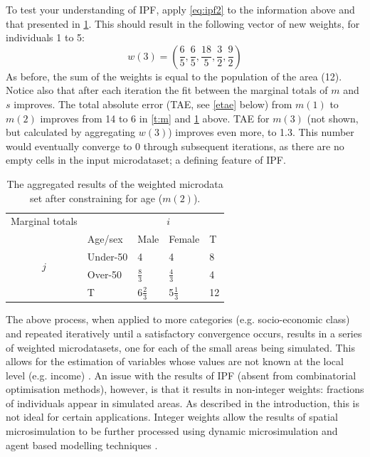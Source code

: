 \documentclass[a4paper, 11pt, twoside]{Thesis}
\begin{document}
To test your understanding of IPF, apply \cref{eq:ipf2} to the information above
and that presented in \cref{t:m2}.
This should result in the following vector of new weights, for individuals 1 to 5:
\begin{equation}
  w(3) = (\frac{6}{5}, \frac{6}{5}, \frac{18}{5}, \frac{3}{2}, \frac{9}{2})
\end{equation}
As before, the sum of the weights is equal to the population of the area (12).
Notice also that after each iteration the fit between the marginal
totals of $m$ and $s$
improves. The total absolute error (TAE, see \cref{etae} below)
from $m(1)$ to $m(2)$ improves from
14 to 6 in \cref{t:m} and \cref{t:m2} above. TAE for $m(3)$ (not shown,
but calculated by aggregating $w(3)$) improves even more, to 1.3.
This number would eventually converge to 0 through subsequent
iterations, as there are no empty cells in the input microdataset;
a defining feature of IPF.


\begin{table}[htbp]
\centering
\caption[Aggregated results after constraining for age]{The
aggregated results of the weighted
microdata set after constraining for age ($m(2)$).
}

\begin{tabular}{cllll}\toprule
Marginal totals&  & \multicolumn{2}{c}{$i$} & \\
& Age/sex & Male & Female & T\\ \midrule
\multirow{2}{*}{$j$} & Under-50 & 4 & 4 & 8\\
& Over-50 & $\frac{8}{3}$ & $\frac{4}{3}$ & 4 \\
& T & $6\frac{2}{3}$ & 5$\frac{1}{3}$ & 12\\
\bottomrule
\end{tabular}
\label{t:m2}
\end{table}

The above process, when applied to more categories (e.g. socio-economic class)
and repeated iteratively until a satisfactory convergence occurs, results in a
series of weighted microdatasets, one for each of the small areas being
simulated. This allows for the estimation of variables whose values are not
known at the local level (e.g. income) \citep{Ballas2005}. An issue
with the results of IPF (absent from combinatorial optimisation methods),
however, is that it results in non-integer weights: fractions of individuals
appear in simulated areas. As described in the introduction, this is not ideal
for certain applications. Integer weights allow the results of spatial
microsimulation to be further processed using dynamic microsimulation and agent
based modelling techniques \citep{Pritchard2012}.
\end{document}
